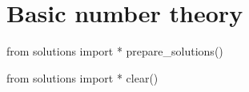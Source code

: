 \chapter{Basic number theory}

\newpage
\newpage
\newpage

\begin{python0}
from solutions import *
prepare_solutions()
\end{python0}

\begin{python0}
from solutions import *
clear()
\end{python0}
